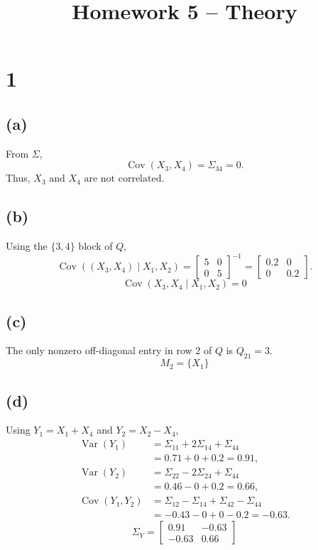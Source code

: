 \documentclass[11pt]{article}
\title{Homework 5 -- Theory}
\author{}
\date{}
\begin{document}
\maketitle

\section*{1}

\subsection*{(a)}

From $\Sigma$,
\[
\operatorname{Cov}(X_3,X_4)=\Sigma_{34}=0.
\]
Thus, $\boxed{X_3 \text{ and } X_4 \text{ are not correlated.}}$

\subsection*{(b)}

Using the $\{3,4\}$ block of $Q$,
\[
\operatorname{Cov}((X_3,X_4)\mid X_1,X_2)
=\begin{bmatrix}5&0\\0&5\end{bmatrix}^{-1}
=\begin{bmatrix}0.2&0\\0&0.2\end{bmatrix}.
\]
\[
\boxed{\operatorname{Cov}(X_3,X_4\mid X_1,X_2)=0}
\]

\subsection*{(c)}

The only nonzero off-diagonal entry in row 2 of $Q$ is $Q_{21}=3$.
\[
\boxed{M_2=\{X_1\}}
\]

\subsection*{(d)}

Using $Y_1=X_1+X_4$ and $Y_2=X_2-X_4$,
\begin{align*}
\operatorname{Var}(Y_1)
&=\Sigma_{11}+2\Sigma_{14}+\Sigma_{44}\\
&=0.71+0+0.2=0.91,\\
\operatorname{Var}(Y_2)
&=\Sigma_{22}-2\Sigma_{24}+\Sigma_{44}\\
&=0.46-0+0.2=0.66,\\
\operatorname{Cov}(Y_1,Y_2)
&=\Sigma_{12}-\Sigma_{14}+\Sigma_{42}-\Sigma_{44}\\
&=-0.43-0+0-0.2=-0.63.
\end{align*}
\[
\boxed{\Sigma_Y=
\begin{bmatrix}
0.91&-0.63\\
-0.63&0.66
\end{bmatrix}}
\]
\end{document}
